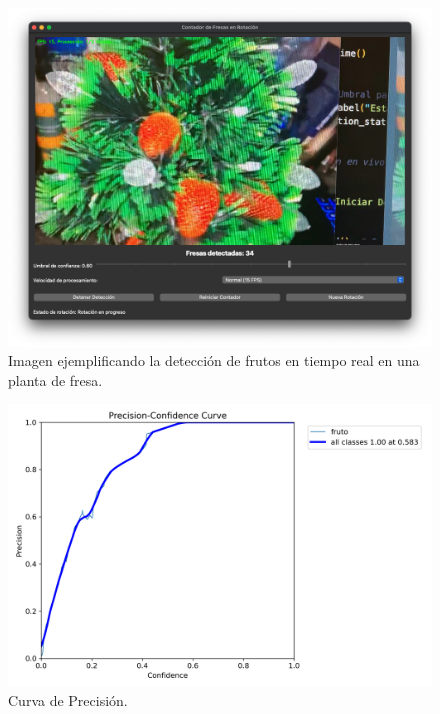 \documentclass[conference]{IEEEtran}
\begin{document}
\begin{figure}[ht]
    \centering
    \includegraphics[width=\columnwidth]{images/real-dec2.png}
    \caption{Imagen ejemplificando la detección de frutos en tiempo real en una planta de fresa.}
    \label{fig:real-dec2}
\end{figure}

\begin{figure}[ht]
    \centering
    \includegraphics[width=\columnwidth]{images/P_curve.png}
    \caption{Curva de Precisión.}
    \label{fig:P_curve}
\end{figure}
\end{document}
